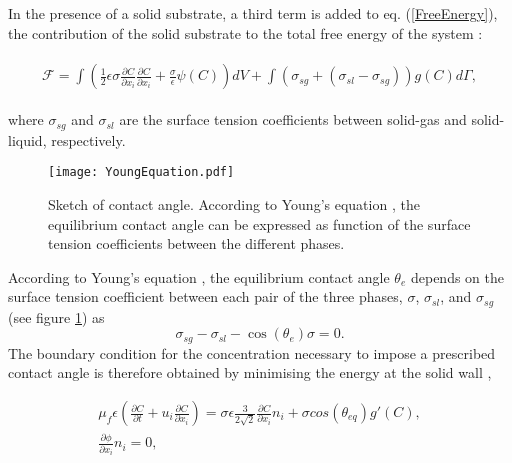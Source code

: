 \documentclass[review]{elsarticle}
\begin{document}
In the presence of a solid substrate, a third term is added to eq.  (\ref{FreeEnergy}), the contribution of the solid substrate to the total free energy of the system \citep{ Carlson2011}:
\begin{linenomath}\begin{equation} \label{FreeEnergySolid}
\begin{aligned}
\begin{gathered}
\mathscr{F}= \int \left( \frac{1}{2} \epsilon \sigma   \frac{\partial C}{\partial x_i}  \frac{\partial C}{\partial x_i} +\frac{\sigma}{\epsilon} \psi (C) \right) dV+ \int \left(\sigma_{sg}+ (\sigma_{sl}-\sigma_{sg})\right)g(C)d\Gamma,
\end{gathered}
\end{aligned}
\end{equation}\end{linenomath}
where $\sigma_{sg}$ and $\sigma_{sl}$ are the surface tension coefficients between solid-gas and solid-liquid, respectively.
\begin{figure} [H]
    \begin{center}
     \texttt{[image: YoungEquation.pdf]}
\caption{Sketch of contact angle. According to Young's equation \citep{Young}, the equilibrium contact angle can be expressed as function of the surface tension coefficients between the different phases.}
\label{fig:YongEquation}
     \end{center}
     \end{figure}
According to Young's equation \citep{Young} , the equilibrium contact angle $\theta_e$ depends on the surface tension coefficient between each pair of the three phases, $ \sigma$, $\sigma_{sl}$, and $\sigma_{sg}$ (see figure \ref{fig:YongEquation}) as \[ \sigma_{sg}-\sigma_{sl}-\cos(\theta_{e})\sigma=0. \] The boundary condition for the concentration 
necessary to impose a prescribed contact angle is therefore obtained by minimising the energy at the solid wall \citep{Jacqmin1999,Jacqmin2000},
\begin{linenomath}\begin{equation} \label{WallBCS}  
\begin{gathered}
  \mu_f \epsilon \left( \frac{\partial C}{\partial t}+ u_i \frac{\partial C}{\partial x_i} \right)= \sigma \epsilon \frac{3}{2 \sqrt 2}\frac{\partial C}{\partial x_i}n_i + \sigma cos(\theta_{eq}) g'(C),\\
  \frac{\partial \phi}{\partial x_i}n_i =0,
   \end{gathered}
\end{equation}\end{linenomath}
\end{document}
